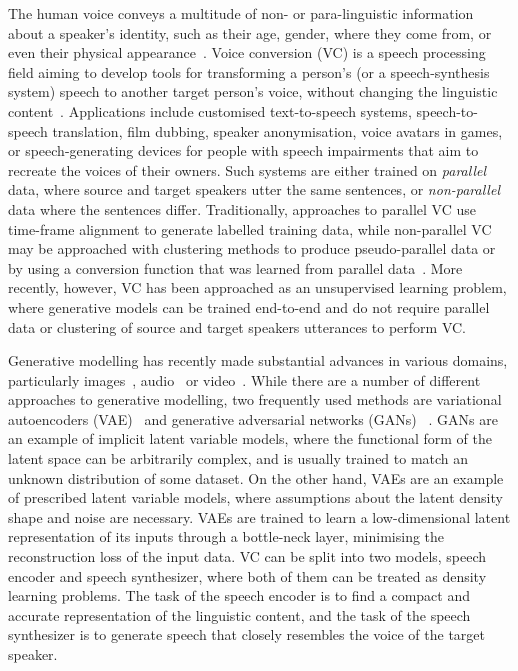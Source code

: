 \documentclass{article}
\begin{document}
The human voice conveys a multitude of non- or para-linguistic information about a speaker's identity, such as their age, gender, where they come from, or even their physical appearance~\citep{Kreiman2011}. Voice conversion (VC) is a speech processing field aiming to develop tools for transforming a person's (or a speech-synthesis system) speech to another target person's voice, without changing the linguistic content~\citep{Abe1990}. Applications include customised text-to-speech systems, speech-to-speech translation, film dubbing, speaker anonymisation, voice avatars in games, or speech-generating devices for people with speech impairments that aim to recreate the voices of their owners. Such systems are either trained on \textit{parallel} data, where source and target speakers utter the same sentences, or \textit{non-parallel} data where the sentences differ. Traditionally, approaches to parallel VC use time-frame alignment to generate labelled training data, while non-parallel VC may be approached with clustering methods to produce pseudo-parallel data or by using a conversion function that was learned from parallel data~\citep{Lorenzo2018}. More recently, however, VC has been approached as an unsupervised learning problem, where generative models can be trained end-to-end and do not require parallel data or clustering of source and target speakers utterances to perform VC. 

Generative modelling has recently made substantial advances in various domains, particularly images~\citep{Karras2018}, audio~\citep{Oord2016} or video~\citep{Vondrick2016}. While there are a number of different approaches to generative modelling, two frequently used methods are variational autoencoders (VAE)~\citep{Kingma2013} and generative adversarial networks (GANs) ~\citep{Goodfellow2014}.
GANs are an example of implicit latent variable models, where the functional form of the latent space can be arbitrarily complex, and is usually trained to match an unknown distribution of some dataset.
On the other hand, VAEs are an example of prescribed latent variable models, where assumptions about the latent density shape and noise are necessary. VAEs are trained to learn a low-dimensional latent representation of its inputs through a bottle-neck layer, minimising the reconstruction loss of the input data.
VC can be split into two models, speech encoder and speech synthesizer, where both of them can be treated as density learning problems. The task of the speech encoder is to find a compact and accurate representation of the linguistic content, and the task of the speech synthesizer is to generate speech that closely resembles the voice of the target speaker.
\end{document}
